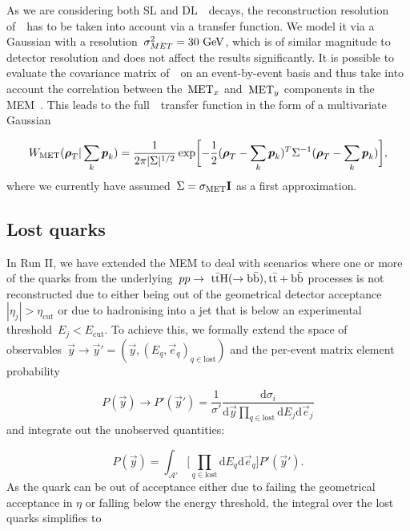 As we are considering both SL and DL~\ttH~decays, the reconstruction resolution of~\MET~has to be taken into account via a transfer function. We model it via a Gaussian with a resolution~$\sigma_{MET}^2 = 30~\mathrm{GeV}$, which is of similar magnitude to detector resolution and does not affect the results significantly.
It is possible to evaluate the covariance matrix of~\MET~on an event-by-event basis and thus take into account the correlation between the~$\mathrm{MET}_x$ and~$\mathrm{MET}_y$ components in the MEM~\cite{2011JInst...6.9001C}. This leads to the full~\MET~transfer function in the form of a  multivariate Gaussian

\begin{equation}
W_{\mathrm{MET}}(\boldsymbol{\rho}_T | \sum_k \boldsymbol{p}_k) = \frac{1}{2\pi |\Sigma|^{1/2}} \exp \biggl[ -\frac{1}{2} (\boldsymbol{\rho}_T - \sum_k \boldsymbol{p}_k)^T \Sigma^{-1} (\boldsymbol{\rho}_T - \sum_k \boldsymbol{p}_k)\biggr],
\end{equation}
where we currently have assumed~$\Sigma = \sigma_{\mathrm{MET}} \mathbf{I}$ as a first approximation.

\subsection{Lost quarks}
\label{sec:lost_quarks}

In Run II, we have extended the MEM to deal with scenarios where one or more of the quarks from the underlying~$pp \rightarrow~\mathrm{t} \bar{\mathrm{t}} \mathrm{H}(\rightarrow \mathrm{b}\bar{\mathrm{b}}),\mathrm{t} \bar{\mathrm{t}} + \mathrm{b}\bar{\mathrm{b}}$ processes is not reconstructed due to either being out of the geometrical detector acceptance~$|\eta_j| > \eta_{\mathrm{cut}}$ or due to hadronising into a jet that is below an experimental threshold~$E_j < E_{\mathrm{cut}}$.
To achieve this, we formally extend the space of observables~$\vec{y} \rightarrow \vec{y}' = (\vec{y}, (E_q, \vec{e}_q)_{q \in \mathrm{lost}})$ and the per-event matrix element probability

\begin{equation}
P(\vec{y}) \rightarrow P'(\vec{y}') = \frac{1}{\sigma'} \frac{\mathrm{d} \sigma_i}{\mathrm{d}\vec{y} \prod_{q\in\mathrm{lost}} \mathrm{d}E_j \mathrm{d}\vec{e}_j}
\end{equation}
and integrate out the unobserved quantities:

\begin{equation}
P(\vec{y}) = \int_{\mathcal{A}'} \bigl[ \prod_{q \in \mathrm{lost}} \mathrm{d}E_q \mathrm{d}\vec{e}_q \bigr] P'(\vec{y}').
\end{equation}
As the quark can be out of acceptance either due to failing the geometrical acceptance in $\eta$ or falling below the energy threshold, the integral over the lost quarks simplifies to

